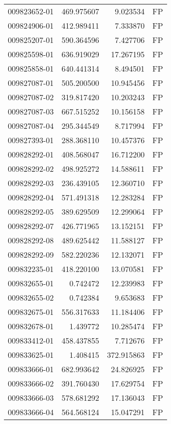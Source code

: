 \begin{tabular}{lrrl}
009823652-01 &  469.975607 &     9.023534 &   FP \\
009824906-01 &  412.989411 &     7.333870 &   FP \\
009825207-01 &  590.364596 &     7.427706 &   FP \\
009825598-01 &  636.919029 &    17.267195 &   FP \\
009825858-01 &  640.441314 &     8.494501 &   FP \\
009827087-01 &  505.200500 &    10.945456 &   FP \\
009827087-02 &  319.817420 &    10.203243 &   FP \\
009827087-03 &  667.515252 &    10.156158 &   FP \\
009827087-04 &  295.344549 &     8.717994 &   FP \\
009827393-01 &  288.368110 &    10.457376 &   FP \\
009828292-01 &  408.568047 &    16.712200 &   FP \\
009828292-02 &  498.925272 &    14.588611 &   FP \\
009828292-03 &  236.439105 &    12.360710 &   FP \\
009828292-04 &  571.491318 &    12.283284 &   FP \\
009828292-05 &  389.629509 &    12.299064 &   FP \\
009828292-07 &  426.771965 &    13.152151 &   FP \\
009828292-08 &  489.625442 &    11.588127 &   FP \\
009828292-09 &  582.220236 &    12.132071 &   FP \\
009832235-01 &  418.220100 &    13.070581 &   FP \\
009832655-01 &    0.742472 &    12.239983 &   FP \\
009832655-02 &    0.742384 &     9.653683 &   FP \\
009832675-01 &  556.317633 &    11.184406 &   FP \\
009832678-01 &    1.439772 &    10.285474 &   FP \\
009833412-01 &  458.437855 &     7.712676 &   FP \\
009833625-01 &    1.408415 &   372.915863 &   FP \\
009833666-01 &  682.993642 &    24.826925 &   FP \\
009833666-02 &  391.760430 &    17.629754 &   FP \\
009833666-03 &  578.681292 &    17.136043 &   FP \\
009833666-04 &  564.568124 &    15.047291 &   FP \\

\end{tabular}
